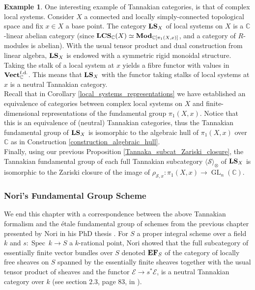 \documentclass{article}
\theoremstyle{plain}
\theoremstyle{definition}
\newtheorem{example}[theorem]{Example}
\DeclareMathOperator{\GL}{GL}
\DeclareMathOperator{\Spec}{Spec}
\DeclareMathOperator{\EF}{\bf{EF}}
\DeclareMathOperator{\Vect}{\bf{Vect}}
\DeclareMathOperator{\LCS}{\bf{LCS}}
\DeclareMathOperator{\Mod}{\bf{Mod}}
\DeclareMathOperator{\LS}{\bf{LS}}
\begin{document}
\begin{example}
    One interesting example of Tannakian categories, is that of complex local systems.
    Consider $X$ a connected and locally simply-connected topological space and fix $x\in X$ a base point.
    The category $\LS_X$ of local systems on $X$ is a $\mathbb{C}$-linear abelian category (since $\LCS_{\mathbb{C}}(X) \simeq \Mod_{\mathbb{C}[\pi_1(X,x)]}$, and a category of $R$-modules is abelian). 
    With the usual tensor product and dual construction from linear algebra, $\LS_X$ is endowed with a symmetric rigid monoidal structure.
    Taking the stalk of a local system at $x$ yields a fibre functor with values in $\Vect^{\text{f.d.}}_{\mathbb{C}}$.
    This means that $\LS_X$ with the functor taking stalks of local systems at $x$ is a neutral Tannakian category.\\
    Recall that in Corollary \ref{local_systems_representations} we have established an equivalence of categories between complex local systems on $X$ and finite-dimensional representations of the fundamental group $\pi_1(X,x)$. 
    Notice that this is an equivalence of (neutral) Tannakian categories, thus the Tannakian fundamental group of $\LS_X$ is isomorphic to the algebraic hull of $\pi_1(X,x)$ over $\mathbb{C}$ as in Construction \ref{construction_algebraic_hull}.\\
    Finally, using our previous Proposition \ref{Tannaka_subcat_Zariski_closure}, the Tannakian fundamental group of each full Tannakian subcategory $\langle \mathcal{S}\rangle_{\otimes}$ of $\LS_X$ is isomorphic to the Zariski closure of the image of $\rho_{\mathcal{S},x} : \pi_1(X,x)\rightarrow \GL_n(\mathbb{C})$.
\end{example}

\subsubsection{Nori's Fundamental Group Scheme}

\noindent We end this chapter with a correspondence between the above Tannakian formalism and the \'etale fundamental group of schemes from the previous chapter presented by Nori in his PhD thesis \cite{Nori}.
For $S$ a proper integral scheme over a field $k$ and $s:\Spec\: k\rightarrow S$ a $k$-rational point, Nori showed that 
the full subcategory of essentially finite vector bundles over $S$ denoted $\EF_S$ of the category of locally free sheaves on $S$ spanned by the essentially finite sheaves together with the usual tensor product of sheaves and the functor $\mathcal{E}\rightarrow s^*\mathcal{E}$, is a neutral Tannakian category over $k$
(see section $2.3$, page $83$, in \cite{Nori}).
\end{document}
